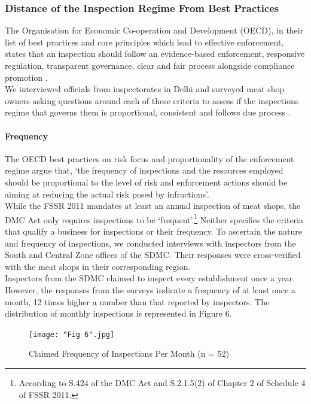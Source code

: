 \documentclass[a4paper, 12pt]{article}
\begin{document}
\subsubsection{Distance of the Inspection Regime From Best Practices}

The Organisation for Economic Co-operation and Development (OECD), in their list of best practices and core principles which lead to effective enforcement, states that an inspection should follow an evidence-based enforcement, responsive regulation, transparent governance, clear and fair process alongside compliance promotion \parencite{oecd1report}. \\

We interviewed officials from inspectorates in Delhi and surveyed meat shop owners asking questions around each of these criteria to assess if the inspections regime that governs them is proportional, consistent and follows due process \parencite{oecd1report}. 

\paragraph{Frequency}
The OECD best practices on risk focus and proportionality of the enforcement regime argue that, ‘the frequency of inspections and the resources employed should be proportional to the level of risk and enforcement actions should be aiming at reducing the actual risk posed by infractions’. \\

While the FSSR 2011 mandates at least an annual inspection of meat shops, the DMC Act only requires inspections to be ‘frequent’.\footnote{According to S.424 of the DMC Act and S.2.1.5(2) of Chapter 2 of Schedule 4 of FSSR 2011.} Neither specifies the criteria that qualify a business for inspections or their frequency. To ascertain the nature and frequency of inspections, we conducted interviews with inspectors from the South and Central Zone offices of the SDMC. Their responses were cross-verified with the meat shops in their corresponding region. \\

Inspectors from the SDMC claimed to inspect every establishment once a year. However, the responses from the surveys indicate a frequency of at least once a month, 12 times higher a number than that reported by inspectors. The distribution of monthly inspections is represented in Figure 6. 

\begin{figure}[H]
\centering
\texttt{[image: "Fig 6".jpg]}
\caption[Optional Caption]{Claimed Frequency of Inspections Per Month (n = 52)}
\end{figure} 
\end{document}
